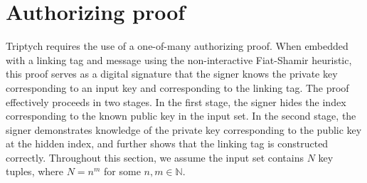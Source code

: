 \documentclass{article}
\begin{document}
\section{Authorizing proof}

Triptych requires the use of a one-of-many authorizing proof.
When embedded with a linking tag and message using the non-interactive Fiat-Shamir heuristic, this proof serves as a digital signature that the signer knows the private key corresponding to an input key and corresponding to the linking tag.
The proof effectively proceeds in two stages.
In the first stage, the signer hides the index corresponding to the known public key in the input set.
In the second stage, the signer demonstrates knowledge of the private key corresponding to the public key at the hidden index, and further shows that the linking tag is constructed correctly.
Throughout this section, we assume the input set contains $N$ key tuples, where $N = n^m$ for some $n,m \in \mathbb{N}$.
\end{document}

